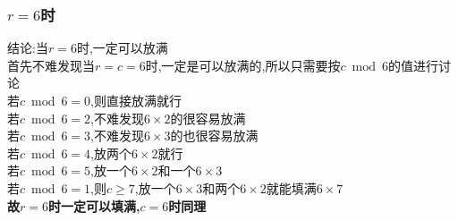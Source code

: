 \documentclass{beamer}
\begin{document}
			\begin{frame}\frametitle{$r=6$时}
				结论:当$r=6$时,一定可以放满\\
				首先不难发现当$r=c=6$时,一定是可以放满的,所以只需要按$c\bmod6$的值进行讨论\\
				若$c\bmod6=0$,则直接放满就行\\
				若$c\bmod6=2$,不难发现$6\times2$的很容易放满\\
				若$c\bmod6=3$,不难发现$6\times3$的也很容易放满\\
				若$c\bmod6=4$,放两个$6\times2$就行\\
				若$c\bmod6=5$,放一个$6\times2$和一个$6\times3$\\
				若$c\bmod6=1$,则$c\ge7$,放一个$6\times3$和两个$6\times2$就能填满$6\times7$\\
				\textbf{故$r=6$时一定可以填满,$c=6$时同理}
			\end{frame}
\end{document}
